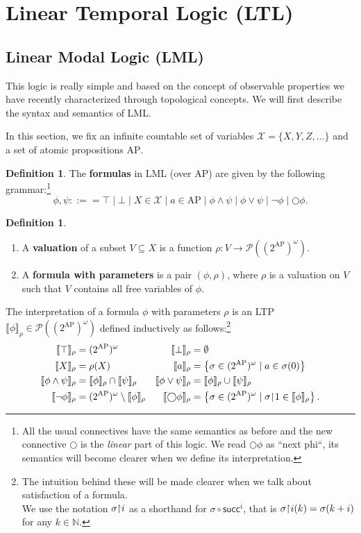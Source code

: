 \documentclass{tufte-handout} %
\theoremstyle{definition}
\newtheorem{defn}[thm]{Definition}
\theoremstyle{remark}
\newcommand{\bra}[1]{\left(#1\right)}
\newcommand{\N}{\mathbb{N}}
\newcommand{\mP}{\mathcal{P}}
\newcommand{\0}{\textsf{0}}
\newcommand{\1}{\textsf{1}}
\newcommand{\mX}{\mathcal{X}}
\newcommand{\AP}{\text{AP}}
\newcommand{\rest}[2]{#1 \kern-0.65ex\upharpoonright \kern-0.55ex #2}
\newcommand{\sem}[2]{\llbracket #1 \rrbracket_{#2}}
\begin{document}
\section{Linear Temporal Logic (LTL)}
\subsection{Linear Modal Logic (LML)}
This logic is really simple and based on the concept of observable properties we have recently characterized through topological concepts. We will first describe the syntax and semantics of LML.

In this section, we fix an infinite countable set of variables $\mX = \{X, Y, Z, \dots \}$ and a set of atomic propositions $\AP$.
\begin{defn}
	The \textbf{formulas} in LML (over $\AP$) are given by the following grammar:\footnote{All the usual connectives have the same semantics as before and the new connective $\bigcirc$ is the \textit{linear} part of this logic. We read $\bigcirc \phi$ as ``next phi``, its semantics will become clearer when we define its interpretation.}
	\[\phi, \psi ::== \top \mid \bot \mid X \in \mX \mid a \in \AP\mid \phi \wedge \psi \mid \phi \vee \psi \mid \neg \phi \mid \bigcirc\phi.\]
\end{defn}
\begin{defn}
	\begin{enumerate}
		\item A \textbf{valuation} of a subset $V \subseteq X$ is a function $\rho: V \rightarrow \mP\bra{(2^{\AP})^{\omega}}$.
		\item A \textbf{formula with parameters} is a pair $(\phi, \rho)$, where $\rho$ is a valuation on $V$ such that $V$ contains all free variables of $\phi$.
	\end{enumerate}
\end{defn}
The interpretation of a formula $\phi$ with parameters $\rho$ is an LTP  $\sem{\phi}{\rho} \in \mP\bra{(2^{\AP})^{\omega}}$  defined inductively as follows:\footnote{The intuition behind these will be made clearer when we talk about satisfaction of a formula.\\
We use the notation $\rest{\sigma}{i}$ as a shorthand for $\sigma \circ \textsf{succ}^i$, that is $\rest{\sigma}{i}(k) = \sigma(k+i)$ for any $k \in \N$.}
\begin{align*}
\sem{\top}{\rho} &= (2^{\AP})^{\omega} &
\sem{\bot}{\rho} &= \emptyset\\
\sem{X}{\rho} &= \rho(X)&
\sem{a}{\rho} &= \left\{\sigma \in (2^{\AP})^{\omega} \mid a \in \sigma(0) \right\}\\
\sem{\phi \wedge \psi}{\rho} &= \sem{\phi}{\rho} \cap \sem{\psi}{\rho}&
\sem{\phi \vee \psi}{\rho} &= \sem{\phi}{\rho} \cup \sem{\psi}{\rho}\\
\sem{\neg \phi}{\rho} &= (2^{\AP})^{\omega} \setminus \sem{\phi}{\rho}&
\sem{\bigcirc \phi}{\rho} &= \left\{ \sigma \in (2^{\AP})^{\omega} \mid \rest{\sigma}{1}\in \sem{\phi}{\rho} \right\}.
\end{align*}
\end{document}
